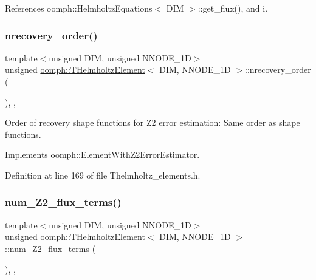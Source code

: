 References oomph\+::\+Helmholtz\+Equations$<$ D\+I\+M $>$\+::get\+\_\+flux(), and i.

\mbox{\label{classoomph_1_1THelmholtzElement_a8b5f6b37b1d0943c99daec3ebe65d3a4}} 
\subsubsection{\texorpdfstring{nrecovery\+\_\+order()}{nrecovery\_order()}}
{\footnotesize\ttfamily template$<$unsigned D\+IM, unsigned N\+N\+O\+D\+E\+\_\+1D$>$ \\
unsigned \hyperlink{classoomph_1_1THelmholtzElement}{oomph\+::\+T\+Helmholtz\+Element}$<$ D\+IM, N\+N\+O\+D\+E\+\_\+1D $>$\+::nrecovery\+\_\+order (\begin{DoxyParamCaption}{ }\end{DoxyParamCaption})\hspace{0.3cm}{\ttfamily [inline]}, {\ttfamily [protected]}, {\ttfamily [virtual]}}



Order of recovery shape functions for Z2 error estimation\+: Same order as shape functions. 



Implements \hyperlink{classoomph_1_1ElementWithZ2ErrorEstimator_af39480835bd3e0f6b2f4f7a9a4044798}{oomph\+::\+Element\+With\+Z2\+Error\+Estimator}.



Definition at line 169 of file Thelmholtz\+\_\+elements.\+h.

\mbox{\label{classoomph_1_1THelmholtzElement_aebf54233a62ec5bea9666aeafce72647}} 
\subsubsection{\texorpdfstring{num\+\_\+\+Z2\+\_\+flux\+\_\+terms()}{num\_Z2\_flux\_terms()}}
{\footnotesize\ttfamily template$<$unsigned D\+IM, unsigned N\+N\+O\+D\+E\+\_\+1D$>$ \\
unsigned \hyperlink{classoomph_1_1THelmholtzElement}{oomph\+::\+T\+Helmholtz\+Element}$<$ D\+IM, N\+N\+O\+D\+E\+\_\+1D $>$\+::num\+\_\+\+Z2\+\_\+flux\+\_\+terms (\begin{DoxyParamCaption}{ }\end{DoxyParamCaption})\hspace{0.3cm}{\ttfamily [inline]}, {\ttfamily [protected]}, {\ttfamily [virtual]}}



